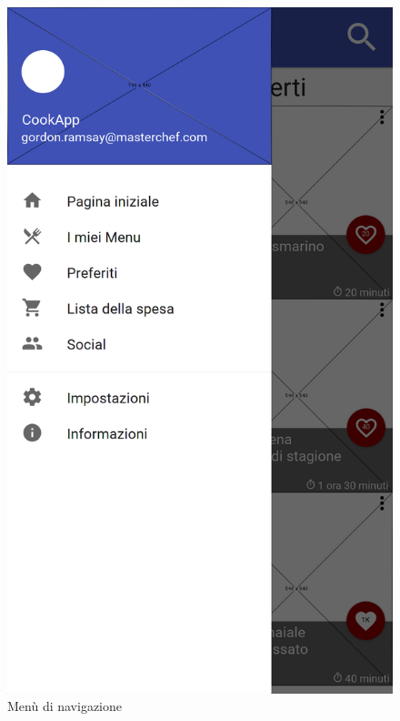 \begin{figure}[H]
	\hfill
	\begin{minipage}{.49\textwidth}
		\includegraphics[width=\textwidth]{img/wireframe/menu.png}
		\caption{Menù di navigazione}
		\label{fig:menu_nav}
	\end{minipage}
\end{figure}	
